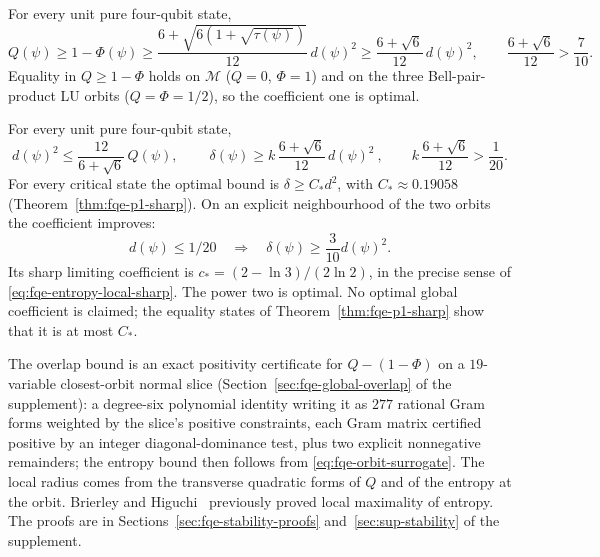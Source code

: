 \begin{theorem}\label{thm:fqe-global-overlap}
For every unit pure four-qubit state,
\begin{equation}\label{eq:fqe-global-overlap-sharp}
 Q(\psi)\ge1-\Phi(\psi)
 \ge\frac{6+\sqrt{6(1+\sqrt{\tau(\psi)})}}{12}\,d(\psi)^2
 \ge\frac{6+\sqrt6}{12}\,d(\psi)^2,\qquad \frac{6+\sqrt6}{12}>\frac7{10}.
\end{equation}
Equality in $Q\ge1-\Phi$ holds on $\mathcal M$ ($Q=0$, $\Phi=1$) and on the three Bell-pair-product LU orbits
($Q=\Phi=1/2$), so the coefficient one is optimal.
\end{theorem}

\begin{theorem}\label{thm:fqe-orbit-stability}
For every unit pure four-qubit state,
\[
 d(\psi)^2\le\frac{12}{6+\sqrt6}\,Q(\psi),\qquad
 \boxed{\ \delta(\psi)\ge k\,\frac{6+\sqrt6}{12}\,d(\psi)^2\ },\qquad k\,\frac{6+\sqrt6}{12}>\frac1{20}.
\]
For every critical state the optimal bound is $\delta\ge C_*d^2$, with
$C_*\approx0.19058$ (Theorem~\ref{thm:fqe-p1-sharp}).
On an explicit neighbourhood of the two orbits the coefficient improves:
\[
 d(\psi)\le1/20\quad\Longrightarrow\quad
 \delta(\psi)\ge\frac3{10}d(\psi)^2.
\]
Its sharp limiting coefficient is
$c_*=(2-\ln3)/(2\ln2)$, in the precise sense of
\eqref{eq:fqe-entropy-local-sharp}. The power two is optimal.
No optimal global coefficient is claimed; the equality states of
Theorem~\ref{thm:fqe-p1-sharp} show that it is at most $C_*$.
\end{theorem}

The overlap bound is an exact positivity certificate for $Q-(1-\Phi)$ on a $19$-variable closest-orbit normal slice
(Section~\ref{sec:fqe-global-overlap} of the supplement): a degree-six polynomial identity writing it as $277$ rational
Gram forms weighted by the slice's positive constraints, each Gram matrix certified positive by an integer diagonal-dominance test,
plus two explicit nonnegative remainders; the entropy bound then follows from
\eqref{eq:fqe-orbit-surrogate}. The local radius comes from the
transverse quadratic forms of $Q$ and of the entropy at the orbit.
Brierley and Higuchi~\cite{BH} previously proved local maximality of entropy.
The proofs are in Sections~\ref{sec:fqe-stability-proofs} and~\ref{sec:sup-stability} of the supplement.

